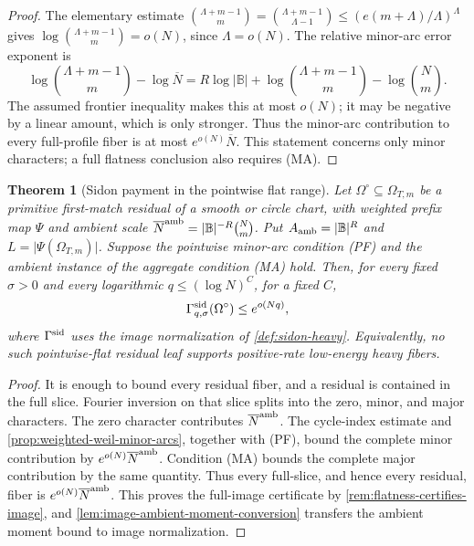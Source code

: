 \documentclass[12pt,a4paper]{amsart}
\numberwithin{equation}{section}
\newtheorem{theorem}{Theorem}[section]
\theoremstyle{remark}
\newcommand{\B}{\mathbb B}
\newcommand{\Omc}{\Omega^{\circ}}
\newcommand{\Gsid}{\Gamma^{\rm sid}}
\newcommand{\barN}{\overline N}
\newcommand{\abs}[1]{\lvert #1\rvert}
\begin{document}
\begin{proof}
The elementary estimate \(\binom{\Lambda+m-1}{m}=\binom{\Lambda+m-1}{\Lambda-1}\le (e(m+\Lambda)/\Lambda)^{\Lambda}\) gives \(\log\binom{\Lambda+m-1}{m}=o(N)\), since \(\Lambda=o(N)\).  The relative minor-arc error exponent is
\[
        \log\binom{\Lambda+m-1}{m}-\log\barN
        =R\log\abs\B+\log\binom{\Lambda+m-1}{m}-\log\binom Nm.
\]
The assumed frontier inequality makes this at most \(o(N)\); it may be
negative by a linear amount, which is only stronger.  Thus the minor-arc
contribution to every full-profile fiber is at most
\(e^{o(N)}\barN\).  This statement concerns only minor characters; a
full flatness conclusion also requires \textup{(MA)}.
\end{proof}

\begin{theorem}[Sidon payment in the pointwise flat range]\label{thm:sidon-resolved-payment}\label{thm:no-sidon-heavy-fourier}\label{thm:fourier-sidon-closure}
Let \(\Omc\subseteq\Omega_{T,m}\) be a primitive first-match residual of a
smooth or circle chart, with weighted prefix map \(\Psi\) and ambient
scale \(\barN^{\rm amb}=\abs\B^{-R}\binom Nm\).  Put
\(A_{\rm amb}=\abs\B^R\) and
\(L=\abs{\Psi(\Omega_{T,m})}\).  Suppose the pointwise minor-arc
condition \textup{(PF)} and the ambient instance of the aggregate
condition \textup{(MA)} hold.
Then, for every fixed \(\sigma>0\) and every
logarithmic \(q\le(\log N)^C\), for a fixed \(C\),
\[
        \Gsid_{q,\sigma}(\Omc)\le e^{o(Nq)},
\]
where \(\Gsid\) uses the image normalization of
\cref{def:sidon-heavy}.
Equivalently, no such pointwise-flat residual leaf supports positive-rate
low-energy heavy fibers.
\end{theorem}

\begin{proof}
It is enough to bound every residual fiber, and a residual is contained in
the full slice.  Fourier inversion on that slice splits into the zero,
minor, and major characters.  The zero character contributes
\(\barN^{\rm amb}\).
The cycle-index estimate and \cref{prop:weighted-weil-minor-arcs}, together
with \textup{(PF)}, bound the complete minor contribution by
\(e^{o(N)}\barN^{\rm amb}\).  Condition \textup{(MA)} bounds the complete major
contribution by the same quantity.  Thus every full-slice, and hence every
residual, fiber is \(e^{o(N)}\barN^{\rm amb}\).  This proves the
full-image certificate by \cref{rem:flatness-certifies-image}, and
\cref{lem:image-ambient-moment-conversion} transfers the ambient moment
bound to image normalization.
\end{proof}
\end{document}
